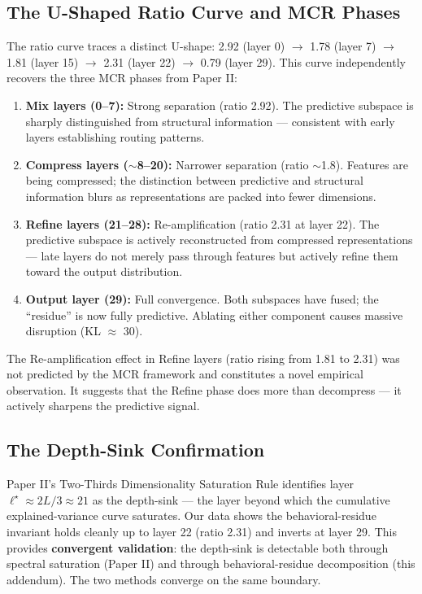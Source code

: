 \documentclass[11pt]{article}
\begin{document}
\subsection{The U-Shaped Ratio Curve and MCR Phases}

The ratio curve traces a distinct U-shape: 2.92 (layer 0) $\to$ 1.78 (layer 7) $\to$ 1.81 (layer 15) $\to$ 2.31 (layer 22) $\to$ 0.79 (layer 29). This curve independently recovers the three MCR phases from Paper II:

\begin{enumerate}
\item \textbf{Mix layers (0--7):} Strong separation (ratio 2.92). The predictive subspace is sharply distinguished from structural information --- consistent with early layers establishing routing patterns.
\item \textbf{Compress layers ($\sim$8--20):} Narrower separation (ratio $\sim$1.8). Features are being compressed; the distinction between predictive and structural information blurs as representations are packed into fewer dimensions.
\item \textbf{Refine layers (21--28):} Re-amplification (ratio 2.31 at layer 22). The predictive subspace is actively reconstructed from compressed representations --- late layers do not merely pass through features but actively refine them toward the output distribution.
\item \textbf{Output layer (29):} Full convergence. Both subspaces have fused; the ``residue'' is now fully predictive. Ablating either component causes massive disruption (KL $\approx$ 30).
\end{enumerate}

The Re-amplification effect in Refine layers (ratio rising from 1.81 to 2.31) was not predicted by the MCR framework and constitutes a novel empirical observation. It suggests that the Refine phase does more than decompress --- it actively sharpens the predictive signal.

\subsection{The Depth-Sink Confirmation}

Paper II's Two-Thirds Dimensionality Saturation Rule identifies layer $\ell^\star \approx 2L/3 \approx 21$ as the depth-sink --- the layer beyond which the cumulative explained-variance curve saturates. Our data shows the behavioral-residue invariant holds cleanly up to layer 22 (ratio 2.31) and inverts at layer 29. This provides \textbf{convergent validation}: the depth-sink is detectable both through spectral saturation (Paper II) and through behavioral-residue decomposition (this addendum). The two methods converge on the same boundary.
\end{document}
